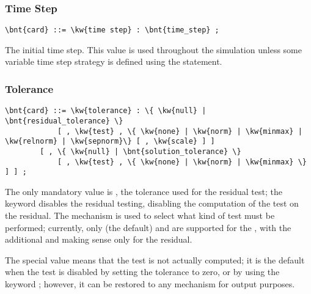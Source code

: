 \subsubsection{Time Step}
\begin{Verbatim}[commandchars=\\\{\}]
    \bnt{card} ::= \kw{time step} : \bnt{time_step} ;
\end{Verbatim}
The initial time step.
This value is used throughout the simulation unless some variable time step
strategy is defined using the  statement.

\subsubsection{Tolerance}\label{sec:IVP:TOLERANCE}
\begin{Verbatim}[commandchars=\\\{\}]
    \bnt{card} ::= \kw{tolerance} : \{ \kw{null} | \bnt{residual_tolerance} \}
            [ , \kw{test} , \{ \kw{none} | \kw{norm} | \kw{minmax} | \kw{relnorm} | \kw{sepnorm}\} [ , \kw{scale} ] ]
        [ , \{ \kw{null} | \bnt{solution_tolerance} \} 
            [ , \kw{test} , \{ \kw{none} | \kw{norm} | \kw{minmax} \} ] ] ;
\end{Verbatim}
The only mandatory value is , 
the tolerance used for the residual test; the keyword 
disables the residual testing, disabling the computation
of the test on the residual.
The  mechanism is used to select what kind of test must
be performed; currently, only  (the default) 
and  are supported for the , with
the additional  and  making sense only for the residual.

The special value  means that the test is not actually 
computed; it is the default when the test is disabled by setting
the tolerance to zero, or by using the keyword ;
however, it can be restored to any mechanism for output purposes.

